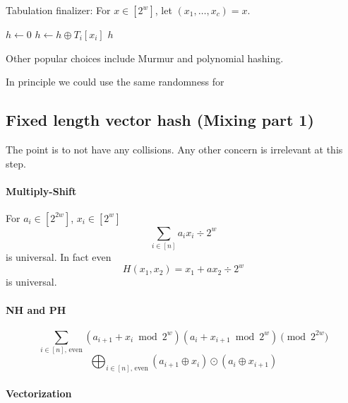 \begin{algorithm}[H]
   \caption{
      Tabulation finalizer:
      For $x\in[2^w]$, let $(x_1, \dots, x_c) = x$.
   }
   \begin{algorithmic}
      \State $h\gets 0$
         \State $h\gets h \oplus T_i[x_i]$
      \EndFor
      \State \Return $h$
   \end{algorithmic}
\end{algorithm}

Other popular choices include Murmur and polynomial hashing.

In principle we could use the same randomness for 

\subsection{Fixed length vector hash (Mixing part 1)}

The point is to not have any collisions.
Any other concern is irrelevant at this step.

\paragraph{Multiply-Shift}
For $a_i\in[2^{2w}]$, $x_i\in[2^w]$
\[
   \sum_{i\in[n]} a_{i} x_i \div 2^{w}
\]
is universal.
In fact even
\[
   H(x_1, x_2) = x_1 + a x_2 \div 2^w
\]
is universal.

\paragraph{NH and PH}

\[
   \sum_{i\in[n]\text{, even}} (a_{i+1} + x_i \bmod 2^w)(a_i + x_{i+1} \bmod 2^w) \pmod{2^{2w}}
\]
\[
   \bigoplus_{i\in[n]\text{, even}} (a_{i+1} \oplus x_i)\odot(a_i \oplus x_{i+1})
\]

\paragraph{Vectorization}

